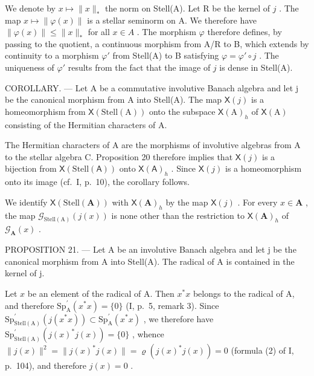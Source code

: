 We denote by \(x \mapsto \|x\|_*\) the norm on Stell(A). Let R be the kernel of \(j\) . The map \(x \mapsto \| \varphi(x) \|\) is a stellar seminorm on A. We therefore have \(\| \varphi(x) \| \leqslant \| x \|_*\) for all \(x \in A\) . The morphism \(\varphi\) therefore defines, by passing to the quotient, a continuous morphism from A/R to B, which extends by continuity to a morphism \(\varphi'\) from Stell(A) to B satisfying \(\varphi = \varphi' \circ j\) . The uniqueness of \(\varphi'\) results from the fact that the image of \(j\) is dense in Stell(A).

COROLLARY. --- Let A be a commutative involutive Banach algebra and let j be the canonical morphism from A into Stell(A). The map \(\mathsf{X}(j)\) is a homeomorphism from \(\mathsf{X}(\mathrm{Stell}(\mathrm{A}))\) onto the subspace \(\mathsf{X}(\mathrm{A})_{h}\) of \(\mathsf{X}(\mathrm{A})\) consisting of the Hermitian characters of A.

The Hermitian characters of A are the morphisms of involutive algebras from A to the stellar algebra C. Proposition 20 therefore implies that \(\mathsf{X}(j)\) is a bijection from \(\mathsf{X}(\mathrm{Stell}(\mathsf{A}))\) onto \(\mathsf{X}(\mathsf{A})_h\) . Since \(\mathsf{X}(j)\) is a homeomorphism onto its image (cf.~I, p.~10), the corollary follows.

We identify \(\mathsf{X}(\mathrm{Stell}(\mathbf{A}))\) with \(\mathsf{X}(\mathbf{A})_h\) by the map \(\mathsf{X}(j)\) . For every \(x\in \mathbf{A}\) , the map \(\mathcal{G}_{\mathrm{Stell(A)}}(j(x))\) is none other than the restriction to \(\mathsf{X}(\mathbf{A})_h\) of \(\mathcal{G}_{\mathbf{A}}(x)\) .

PROPOSITION 21. --- Let A be an involutive Banach algebra and let j be the canonical morphism from A into Stell(A). The radical of A is contained in the kernel of j.

Let \(x\) be an element of the radical of A. Then \(x^{*}x\) belongs to the radical of A, and therefore \(\mathrm{Sp}_{\mathrm{A}}^{\prime}(x^{*}x) = \{0\}\) (I, p.~5, remark 3). Since \(\mathrm{Sp}_{\mathrm{Stell(A)}}^{\prime}(j(x^{*}x)) \subset \mathrm{Sp}_{\mathrm{A}}^{\prime}(x^{*}x)\) , we therefore have \(\mathrm{Sp}_{\mathrm{Stell(A)}}^{\prime}(j(x)^{*}j(x)) = \{0\}\) , whence \(\| j(x)\| ^2 = \| j(x)^{*}j(x)\| = \varrho (j(x)^{*}j(x)) = 0\) (formula (2) of I, p.~104), and therefore \(j(x) = 0\) .
\relax{}
